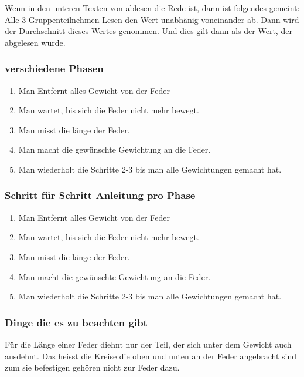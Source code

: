 \documentclass[../main.tex]{subfiles} %
\begin{document}
        Wenn in den unteren Texten von ablesen die Rede ist, dann ist folgendes gemeint:
        Alle 3 Gruppenteilnehmen Lesen den Wert unabhänig voneinander ab. Dann wird der Durchschnitt dieses Wertes genommen. Und dies gilt dann als der Wert, der abgelesen wurde.

 


        \subsubsection{verschiedene Phasen}\label{subsubsec:schritt-fur-schritt-anleitung}
        \begin{enumerate}
            \item Man Entfernt alles Gewicht von der Feder
            \item Man wartet, bis sich die Feder nicht mehr bewegt.
            \item Man misst die länge der Feder.
            \item Man macht die gewünschte Gewichtung an die Feder.
            \item Man wiederholt die Schritte 2-3 bis man alle Gewichtungen gemacht hat.
        \end{enumerate}

        \subsubsection{Schritt für Schritt Anleitung pro Phase}\label{subsubsec:schritt-fur-schritt-anleitung2}
        \begin{enumerate}
            \item Man Entfernt alles Gewicht von der Feder
            \item Man wartet, bis sich die Feder nicht mehr bewegt.
            \item Man misst die länge der Feder.
            \item Man macht die gewünschte Gewichtung an die Feder.
            \item Man wiederholt die Schritte 2-3 bis man alle Gewichtungen gemacht hat.
        \end{enumerate}

        \subsubsection{Dinge die es zu beachten gibt}\label{subsubsec:dinge-die-es-zu-beachten-gibt}
        Für die Länge einer Feder diehnt nur der Teil, der sich unter dem Gewicht auch ausdehnt.
        Das heisst die Kreise die oben und unten an der Feder angebracht sind zum sie befestigen gehören nicht zur Feder dazu.
\end{document}
